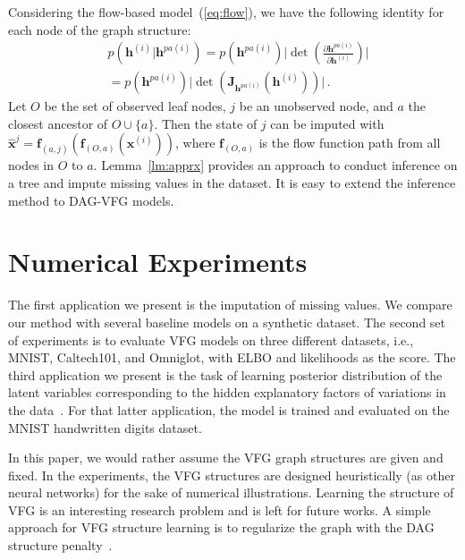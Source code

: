 \documentclass[sigconf, anonymous, review]{acmart}
\theoremstyle{plain}
\theoremstyle{definition}
\theoremstyle{remark}
\begin{document}
Considering the flow-based model~(\ref{eq:flow}), we have the following identity for each node of the graph structure:
\begin{align*}
& p(\mathbf{h}^{(i)} | \mathbf{h}^{pa(i)})  = p(\mathbf{h}^{pa(i)}) \big|\det(\frac{\partial \mathbf{h}^{pa(i)} }{\partial \mathbf{h}^{(i)}})\big| \\
& =
p(\mathbf{h}^{pa(i)}) \big|\det(\mathbf{J}_{\mathbf{h}^{pa(i)}}(\mathbf{h}^{(i)}))\big| \, .
\end{align*}
Let $O$ be the set of observed leaf nodes, $j$ be an unobserved node, and $a$ the closest ancestor of $O \cup \{a\}$. 
Then the state of $j$ can be imputed with $\widehat{\mathbf{x}}^{j}= \mathbf{f}_{(a,j)}(\mathbf{f}_{(O, a)}(\mathbf{x}^{(i)}))$, where $\mathbf{f}_{(O, a)}$ is the flow function path from all nodes in $O$ to $a$. Lemma~\ref{lm:apprx} provides an approach to conduct inference on a tree and impute missing values in the dataset. It is easy to extend the inference method to DAG-VFG models. 



\section{Numerical Experiments}\label{sec:numerical}
The first  application we present is the imputation of missing values. We compare our method with several baseline models  on a synthetic dataset.
The second set of experiments is to evaluate VFG models on three different datasets, i.e.,  MNIST, Caltech101, and Omniglot, with ELBO and likelihoods as the score.  
The third application we present is the task of learning posterior distribution of the latent variables corresponding to the hidden explanatory factors of variations in the data~\cite{bengio2013representation}.
For that latter application, the model is trained and evaluated on the MNIST handwritten digits dataset.
 
 

In this paper,  we would rather assume the VFG graph structures are given and fixed.  In the experiments, the VFG structures are designed heuristically (as other neural networks) for the sake of numerical illustrations.  Learning the structure of VFG is an interesting research problem and is left for future works. A simple approach for VFG structure learning is to regularize the graph with the DAG structure penalty~\cite{Zheng2018,wehenkel2021graphical}.
\end{document}
